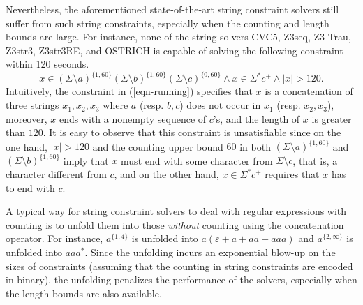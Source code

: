 Nevertheless, the aforementioned state-of-the-art string constraint solvers still suffer from such string constraints, especially when the counting and length bounds are large. For instance, none of the string solvers CVC5, Z3seq, Z3-Trau, Z3str3, Z3str3RE, and OSTRICH is capable of solving the following constraint within 120 seconds.
%
\begin{equation}\label{eqn-running}
x \in (\Sigma \setminus a)^{\{1, 60\}} (\Sigma \setminus b)^{\{1, 60\}} (\Sigma \setminus c)^{\{0, 60\}} \wedge x \in \Sigma^* c^+ \wedge |x| > 120.
\end{equation}
Intuitively, the constraint in (\ref{eqn-running}) specifies that $x$ is a concatenation of three strings $x_1, x_2, x_3$ where $a$ (resp. $b, c$) does not occur in $x_1$ (resp. $x_2, x_3$), moreover, $x$ ends with a nonempty sequence of $c$'s, and the length of $x$ is greater than $120$. It is easy to observe that this constraint is unsatisfiable since on the one hand, $|x| > 120$ and the counting upper bound $60$ in both $(\Sigma \setminus a)^{\{1, 60\}}$ and $(\Sigma \setminus b)^{\{1, 60\}}$ imply that $x$ must end with some character from $\Sigma \setminus c$, that is, a character different from $c$, and on the other hand, $x \in \Sigma^*c^+$ requires that $x$ has to end with $c$.

A typical way for string constraint solvers to deal with regular expressions with counting is to unfold them into those \emph{without} counting using the concatenation operator. For instance, $a^{\{1, 4\}}$ is unfolded into $a(\varepsilon + a + aa + aaa)$ and $a^{\{2,\infty\}}$ is unfolded into $aaa^{*}$. Since the unfolding incurs an exponential blow-up on the sizes of constraints (assuming that the counting in string constraints are encoded in binary), the unfolding penalizes the performance of the solvers, especially when the length bounds are also available.

